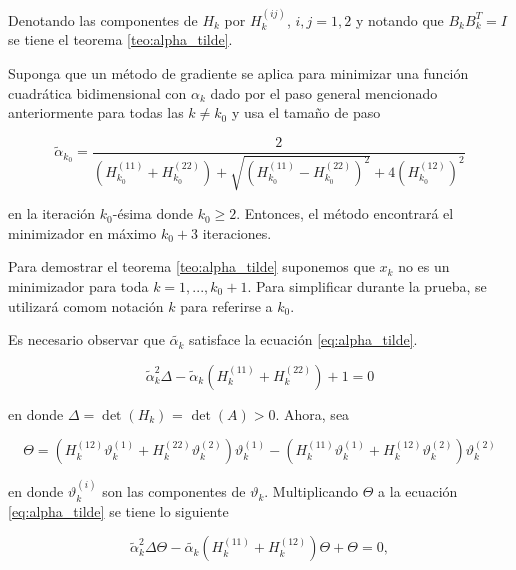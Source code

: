 Denotando las componentes de $H_k$ por $H_k^(ij)$, $i,j = 1,2$ y notando que $B_kB^T_k = I$ se tiene el teorema \ref{teo:alpha_tilde}.

\begin{teor}

	Suponga que un método de gradiente se aplica para minimizar una función cuadrá\-tica bidimensional con $\alpha_k$ dado por el paso general mencionado anteriormente para todas las $k\neq k_0$ y usa el tamaño de paso

	\begin{equation*}
		\tilde{\alpha}_{k_0} = \frac{2}{\left(H^{(11)}_{k_0} + H^{(22)}_{k_0}\right)+\sqrt{\left(H^{(11)}_{k_0} - H^{(22)}_{k_0}\right)^2 } + 4\left(H_{k_0}^{(12)}\right)^2}
	\end{equation*}

	en la iteración $k_0$-ésima donde $k_0\geq 2$. Entonces, el método encontrará el minimizador en máximo $k_0+3$ iteraciones.
	\label{teo:alpha_tilde}
\end{teor}


Para demostrar el teorema \ref{teo:alpha_tilde} suponemos que $x_k$ no es un minimizador para toda $k=1, ..., k_0+1$. Para simplificar durante la prueba, se utilizará comom notación $k$ para referirse a $k_0$.

Es necesario observar que $\tilde{\alpha_k}$ satisface la ecuación \ref{eq:alpha_tilde}.

\begin{equation}
	\tilde{\alpha}^2_k\Delta-\tilde{\alpha}_k\left(H^{(11)}_k + H_k^{(22)}\right) + 1 = 0
	\label{eq:alpha_tilde}
\end{equation}

en donde $\Delta = \det{(H_k)}$ = $\det{(A)}>0$. Ahora, sea

\begin{equation*}
	\Theta = \left(H_k^{(12)}\vartheta_k^{(1)}+ H_k^{(22)}\vartheta^{(2)}_k\right)\vartheta_k^{(1)} -  \left(H_k^{(11)}\vartheta_k^{(1)}+ H_k^{(12)}\vartheta^{(2)}_k\right)\vartheta_k^{(2)}
\end{equation*}

en donde $\vartheta_k^{(i)}$ son las componentes de $\vartheta_k$. Multiplicando $\Theta$ a la ecuación \ref{eq:alpha_tilde} se tiene lo siguiente

\begin{equation*}
	\tilde{\alpha}_k^2\Delta\Theta-\tilde{\alpha_k}\left(H_k^{(11)}+H_k^{(12)}\right)\Theta + \Theta = 0,
\end{equation*}

